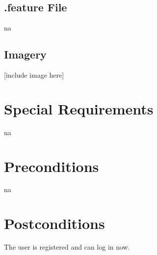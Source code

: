 \documentclass[a4paper,12pt,chapterprefix=false,bibliography=totoc,listof=totoc,book]{scrreprt}
\begin{document}
    \section{.feature File}
    \gls{na}

    \section{Imagery}
    [include image here]

    \chapter{Special Requirements}
    \gls{na}

    \chapter{Preconditions}
    \gls{na}

    \chapter{Postconditions}
    The user is registered and can log in now.
\end{document}
